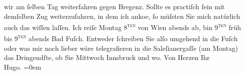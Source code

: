 \begin{ledgroupsized}[t]{13cm}
                    wir am ſelben Tag weiterfahren gegen Bregenz.
                    Sollte es practiſch ſein mit demſelben {\pb}Zug weiterzufahren, in dem
                    ich anko{\geminationm}e, ſo müſsten Sie mich natürlich auch das
                    wiſſen laſſen. Ich reiſe Montag 8\textsc{\textsuperscript{ten}} von Wien abends ab, bin 9\textsc{\textsuperscript{ten}}{ }früh bis 9\textsc{\textsuperscript{ten}}{ }abends{ }Bad Fuſch. Entweder ſchreiben Sie alſo umgehend
                    in die Fuſch oder was mir noch lieber wäre {\pb}telegrafieren in die Saleſianergaſſe (am Montag) das
                    Dringendſte, ob Sie Mittwoch{ }Innsbruck und wo.\pend
           \pstart
           Von Herzen Ihr{\\[\baselineskip]}\spacefill\mbox{Hugo.}\pend
           \leftskip=0em{}\endnumbering{}\end{ledgroupsized}  \newcommand{\dateiname}{L00831}\newcommand{\titel}{Hugo von Hofmannsthal an Arthur Schnitzler, 6. 8. [1898]}\newcommand{\editorInnen}{Martin Anton Müller und Gerd-Hermann Susen}
      